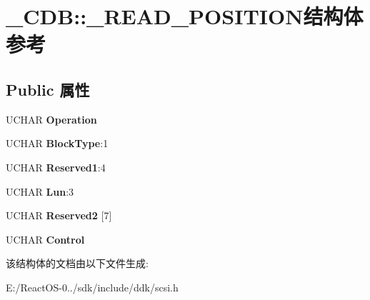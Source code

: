 \hypertarget{struct___c_d_b_1_1___r_e_a_d___p_o_s_i_t_i_o_n}{}\section{\+\_\+\+C\+DB\+:\+:\+\_\+\+R\+E\+A\+D\+\_\+\+P\+O\+S\+I\+T\+I\+O\+N结构体 参考}
\label{struct___c_d_b_1_1___r_e_a_d___p_o_s_i_t_i_o_n}
\subsection*{Public 属性}
\begin{DoxyCompactItemize}
\item 
\mbox{\label{struct___c_d_b_1_1___r_e_a_d___p_o_s_i_t_i_o_n_aa0bfda685b5b0d3ab5bb052015142b49}} 
U\+C\+H\+AR {\bfseries Operation}
\item 
\mbox{\label{struct___c_d_b_1_1___r_e_a_d___p_o_s_i_t_i_o_n_ac443bdf231f4edfdeaad16c62994fdba}} 
U\+C\+H\+AR {\bfseries Block\+Type}\+:1
\item 
\mbox{\label{struct___c_d_b_1_1___r_e_a_d___p_o_s_i_t_i_o_n_a9acecbaabf489ebee1917147a1e05288}} 
U\+C\+H\+AR {\bfseries Reserved1}\+:4
\item 
\mbox{\label{struct___c_d_b_1_1___r_e_a_d___p_o_s_i_t_i_o_n_a650dc5585878f8ccc902a581295d4979}} 
U\+C\+H\+AR {\bfseries Lun}\+:3
\item 
\mbox{\label{struct___c_d_b_1_1___r_e_a_d___p_o_s_i_t_i_o_n_a0badd031b9b00324d60b4561ce217f18}} 
U\+C\+H\+AR {\bfseries Reserved2} \mbox{[}7\mbox{]}
\item 
\mbox{\label{struct___c_d_b_1_1___r_e_a_d___p_o_s_i_t_i_o_n_abc8db44c8b02725a5ed011ab53bf0a44}} 
U\+C\+H\+AR {\bfseries Control}
\end{DoxyCompactItemize}


该结构体的文档由以下文件生成\+:\begin{DoxyCompactItemize}
\item 
E\+:/\+React\+O\+S-\/0../sdk/include/ddk/scsi.\+h\end{DoxyCompactItemize}
